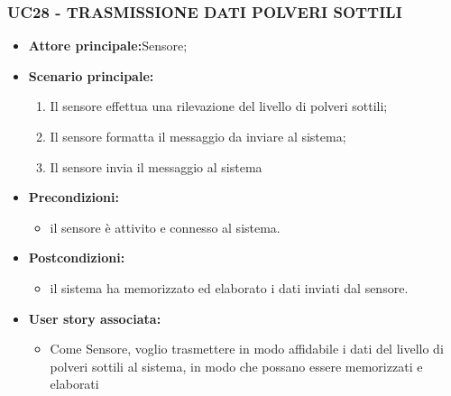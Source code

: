 \subsubsection{UC28 - TRASMISSIONE DATI POLVERI SOTTILI}
\begin{itemize}
    \item \textbf{Attore principale:}Sensore;
    \item \textbf{Scenario principale:}
          \begin{enumerate}
              \item Il sensore effettua una rilevazione del livello di polveri sottili;
              \item Il sensore formatta il messaggio da inviare al sistema;
              \item Il sensore invia il messaggio al sistema
          \end{enumerate}
    \item \textbf{Precondizioni:}
          \begin{itemize}
              \item  il sensore è attivito e connesso al sistema. 
          \end{itemize}
    \item \textbf{Postcondizioni:}
          \begin{itemize}
              \item  il sistema ha memorizzato ed elaborato i dati inviati dal sensore.
          \end{itemize}
    \item \textbf{User story associata:}
          \begin{itemize}
            \item  Come Sensore, voglio trasmettere in modo affidabile i dati del livello di polveri sottili al sistema, in modo che possano essere memorizzati e elaborati 
          \end{itemize}
\end{itemize}
